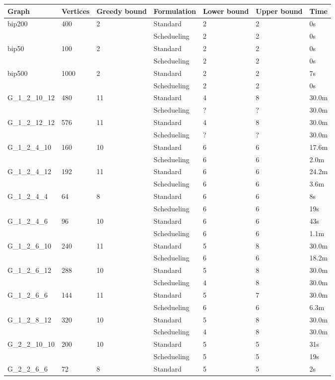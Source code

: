 \centering
\begin{longtable}{|lll|l|l|l|l|}
\toprule
Graph & Vertices &Greedy bound&Formulation&Lower bound &Upper bound&Time\\
\hline
bip200&400&2&Standard&2&2&0s\\
\cline{4-7}
&&&Schedueling&2  &2 &0s\\
\hline
bip50&100&2&Standard&2&2&0s\\
\cline{4-7}
&&&Schedueling&2  &2 &0s\\
\hline
bip500&1000&2&Standard&2&2&7s\\
\cline{4-7}
&&&Schedueling&2  &2 &0s\\
\hline
G\_1\_2\_10\_12&480&11&Standard&4&8&30.0m\\
\cline{4-7}
&&&Schedueling&?  &? &30.0m\\
\hline
G\_1\_2\_12\_12&576&11&Standard&4&8&30.0m\\
\cline{4-7}
&&&Schedueling&?  &? &30.0m\\
\hline
G\_1\_2\_4\_10&160&10&Standard&6&6&17.6m\\
\cline{4-7}
&&&Schedueling&6  &6 &2.0m\\
\hline
G\_1\_2\_4\_12&192&11&Standard&6&6&24.2m\\
\cline{4-7}
&&&Schedueling&6  &6 &3.6m\\
\hline
G\_1\_2\_4\_4&64&8&Standard&6&6&8s\\
\cline{4-7}
&&&Schedueling&6  &6 &19s\\
\hline
G\_1\_2\_4\_6&96&10&Standard&6&6&43s\\
\cline{4-7}
&&&Schedueling&6  &6 &1.1m\\
\hline
G\_1\_2\_6\_10&240&11&Standard&5&8&30.0m\\
\cline{4-7}
&&&Schedueling&6  &6 &18.2m\\
\hline
G\_1\_2\_6\_12&288&10&Standard&5&8&30.0m\\
\cline{4-7}
&&&Schedueling&4  &8 &30.0m\\
\hline
G\_1\_2\_6\_6&144&11&Standard&5&7&30.0m\\
\cline{4-7}
&&&Schedueling&6  &6 &6.3m\\
\hline
G\_1\_2\_8\_12&320&10&Standard&5&8&30.0m\\
\cline{4-7}
&&&Schedueling&4  &8 &30.0m\\
\hline
G\_2\_2\_10\_10&200&10&Standard&5&5&31s\\
\cline{4-7}
&&&Schedueling&5  &5 &19s\\
\hline
G\_2\_2\_6\_6&72&8&Standard&5&5&2s\\

\end{longtable}
